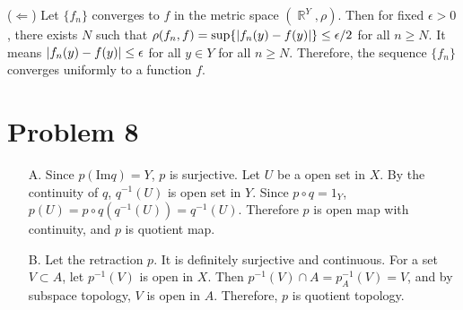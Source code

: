 \documentclass{article}
\DeclareMathOperator{\rr}{\mathbb{R}}
\DeclarePairedDelimiter\abs{\lvert}{\rvert}%
\begin{document}
($\Leftarrow$) Let $\{f_n\}$ converges to $f$ in the metric space $(\rr^Y, \rho)$. Then for fixed $\epsilon>0$, there exists $N$ such that $\rho(f_n, f)=\sup\{\abs{f_n(y)-f(y)}\}\leq \epsilon/2$ for all $n\geq N$. It means $\abs{f_n(y)-f(y)}\leq \epsilon$ for all $y\in Y$ for all $n\geq N$. Therefore, the sequence $\{f_n\}$ converges uniformly to a function $f$.
\section*{Problem 8}
\begin{enumerate}
\item[A.] Since $p(\text{Im}q)=Y$, $p$ is surjective. Let $U$ be a open set in $X$. By the continuity of $q$, $q^{-1}(U)$ is open set in $Y$. Since $p\circ q=1_Y$, $p(U)=p\circ q(q^{-1}(U))=q^{-1}(U)$. Therefore $p$ is open map with continuity, and $p$ is quotient map.
\item[B.] Let the retraction $p$. It is definitely surjective and continuous. For a set $V\subset A$, let $p^{-1}(V)$ is open in $X$. Then $p^{-1}(V)\cap A=p_{A}^{-1}(V)=V$, and by subspace topology, $V$ is open in $A$. Therefore, $p$ is quotient topology.
\end{enumerate}
\end{document}
